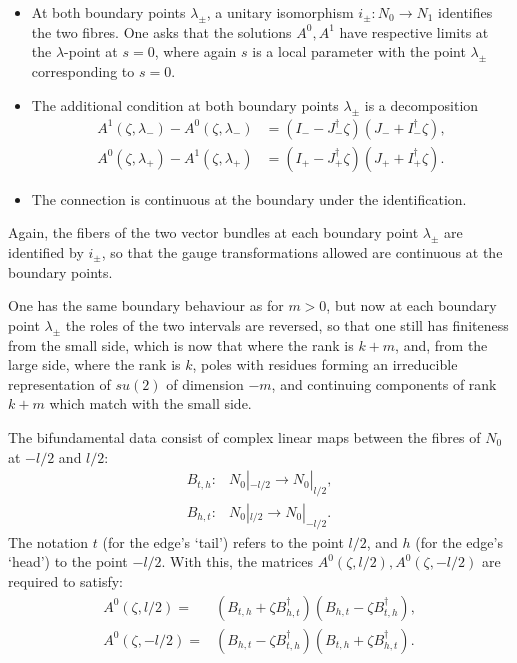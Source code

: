 \documentclass[12pt]{article}
\theoremstyle{definition}
\theoremstyle{remark}
\numberwithin{theorem}{section}
\begin{document}
\medskip

\begin{itemize}
\item At both boundary points $\lambda_\pm$, a unitary isomorphism
$i_\pm\colon N_0\rightarrow N_1$ identifies the two fibres. One asks that the solutions $A^0, A^1$ have respective limits at the $\lambda$-point at $s=0$, where again $s$ is a local parameter with the point $\lambda_\pm$ corresponding to
$s=0.$%
\item The additional condition at both boundary points $\lambda_\pm$ is a  decomposition
\begin{align}
A^1(\zeta,\lambda_-)-A^0(\zeta,\lambda_-) &= (I_- -J_-^\dagger\zeta)(J_- +I_-^\dagger\zeta),\\
A^0(\zeta,\lambda_+)-A^1(\zeta,\lambda_+) &= (I_+ -J_+^\dagger\zeta)(J_+ +I_+^\dagger\zeta).
\end{align}
\item The connection is continuous at the boundary under the identification.
\end{itemize}
Again, the fibers of the two vector bundles  at each boundary point $\lambda_\pm$ are identified by $i_\pm$, so that the gauge transformations allowed are continuous at the boundary points.
\bigskip

\medskip

One has the same boundary behaviour as for $m>0$, but now  at each boundary point $\lambda_\pm$ the roles of the two intervals are reversed, so that one still has finiteness from the small side, which is now that where the rank is $k+m$, and, from the large side, where the rank  is $k$,  poles with residues forming an irreducible 
representation of $su(2)$ of dimension $-m$, and continuing components of rank $k+m$ which match with the small side.
\bigskip

\medskip

The bifundamental data consist of complex linear maps between the fibres of $N_0$ at $-l/2$ and $l/2$:
\begin{align} B_{t,h} : &N_0|_{-l/2}\rightarrow N_0|_{l/2},\\ 
B_{h,t}:&N_0|_{l/2} \rightarrow N_0|_{-l/2}.\end{align}
The notation $t$ (for the edge's `tail') refers to the point $l/2$, and $h$ (for the edge's `head') to the point $-l/2$. With this, the matrices $A^0(\zeta,l/2), A^0(\zeta,-l/2)$ are required to satisfy:
\begin{align}
A^0(\zeta,l/2) =& (B_{t,h} +\zeta B_{h,t}^\dagger)(B_{h,t} -\zeta B_{t,h}^\dagger),\\ A^0(\zeta,-l/2)=& (B_{h,t} -\zeta B_{t,h}^\dagger)(B_{t,h} +\zeta B_{h,t}^\dagger).\end{align}
\end{document}
